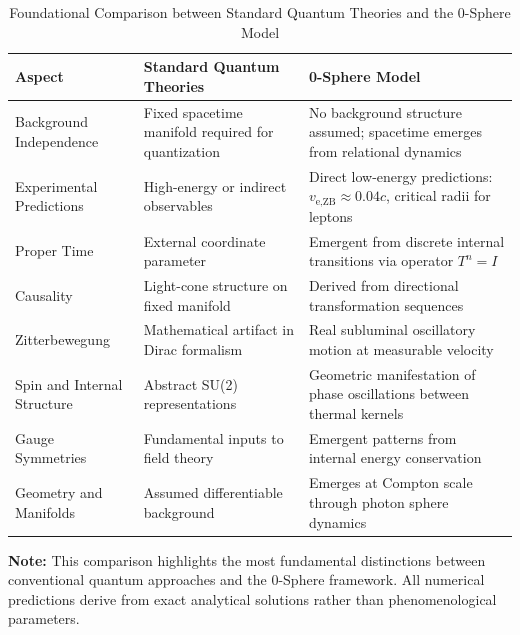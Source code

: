 \documentclass[%
 reprint,
 amsmath,amssymb,
 aps,
]{revtex4-1}
\numberwithin{equation}{section}%
\begin{document}
\begin{table}[!htbp]
\caption{Foundational Comparison between Standard Quantum Theories and the 0-Sphere Model}
\label{tab:comparison_s0}
\renewcommand{\arraystretch}{1.4}
\begin{tabular}{p{4.5cm}p{6.0cm}p{6.0cm}}
\toprule
\textbf{Aspect} & \textbf{Standard Quantum Theories} & \textbf{0-Sphere Model} \\
\midrule
Background Independence & Fixed spacetime manifold required for quantization & No background structure assumed; spacetime emerges from relational dynamics \\
\addlinespace[0.3cm]
Experimental Predictions & High-energy or indirect observables & Direct low-energy predictions: $v_{\text{e,ZB}} \approx 0.04c$, critical radii for leptons~\cite{hanamura2501.0130} \\
\addlinespace[0.3cm]
Proper Time & External coordinate parameter & Emergent from discrete internal transitions via operator $T^n = I$ \\
\addlinespace[0.3cm]
Causality & Light-cone structure on fixed manifold & Derived from directional transformation sequences \\
\addlinespace[0.3cm]
Zitterbewegung & Mathematical artifact in Dirac formalism & Real subluminal oscillatory motion at measurable velocity \\
\addlinespace[0.3cm]
Spin and Internal Structure & Abstract SU(2) representations & Geometric manifestation of phase oscillations between thermal kernels \\
\addlinespace[0.3cm]
Gauge Symmetries & Fundamental inputs to field theory & Emergent patterns from internal energy conservation \\
\addlinespace[0.3cm]
Geometry and Manifolds & Assumed differentiable background & Emerges at Compton scale through photon sphere dynamics \\
\bottomrule
\end{tabular}
\vspace{0.2cm}
\begin{flushleft}
\footnotesize
\textbf{Note:} This comparison highlights the most fundamental distinctions between conventional quantum approaches and the 0-Sphere framework. All numerical predictions derive from exact analytical solutions rather than phenomenological parameters.
\end{flushleft}
\end{table}
\end{document}
